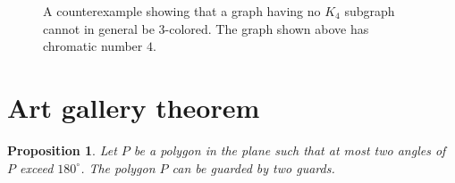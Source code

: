 \documentclass[12pt,letterpaper]{article}
\newcommand{\question}{\section}
\newtheorem{prop}{Proposition}
\newcommand{\degrees}{^\circ}
\newcommand{\mknode}[1]{\node[mynode] (#1) {} ;}
\begin{document}
\begin{figure}[ht]
    \begin{center}
    \end{center}
    \caption{
        A counterexample showing that a graph having no $K_4$ subgraph cannot
        in general be $3$-colored. The graph shown above has chromatic number
        $4$.
    }
    \label{fig:counterexample}
\end{figure}

\question{Art gallery theorem}

\begin{prop}
    Let $P$ be a polygon in the plane such that at most two angles of $P$
    exceed $180\degrees$. The polygon $P$ can be guarded by two guards.
\end{prop}
\end{document}
